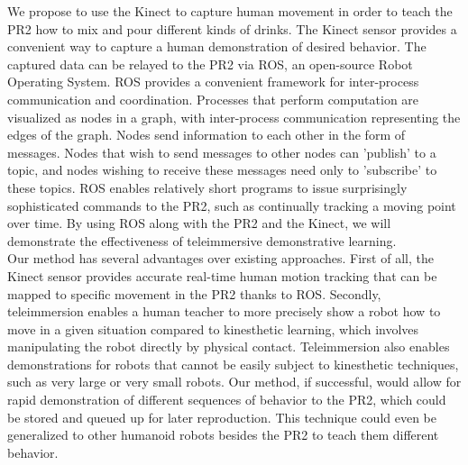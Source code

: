 \documentclass{sig-alternate}
\begin{document}
We propose to use the Kinect to capture human movement in order to teach the PR2 how to mix and pour different kinds of drinks. The Kinect sensor provides a convenient way to capture a human demonstration of desired behavior. The captured data can be relayed to the PR2 via ROS, an open-source Robot Operating System\cite{ros}. ROS provides a convenient framework for inter-process communication and coordination. Processes that perform computation are visualized as nodes in a graph, with inter-process communication representing the edges of the graph. Nodes send information to each other in the form of messages. Nodes that wish to send messages to other nodes can 'publish' to a topic, and nodes wishing to receive these messages need only to 'subscribe' to these topics. ROS enables relatively short programs to issue surprisingly sophisticated commands to the PR2, such as continually tracking a moving point over time. By using ROS along with the PR2 and the Kinect, we will demonstrate the effectiveness of teleimmersive demonstrative learning.\\
Our method has several advantages over existing approaches. First of all, the Kinect sensor provides accurate real-time human motion tracking that can be mapped to specific movement in the PR2 thanks to ROS. Secondly, teleimmersion enables a human teacher to more precisely show a robot how to move in a given situation compared to kinesthetic learning, which involves manipulating the robot directly by physical contact. Teleimmersion also enables demonstrations for robots that cannot be easily subject to kinesthetic techniques, such as very large or very small robots. Our method, if successful, would allow for rapid demonstration of different sequences of behavior to the PR2, which could be stored and queued up for later reproduction. This technique could even be generalized to other humanoid robots besides the PR2 to teach them different behavior.\\	
\end{document}
